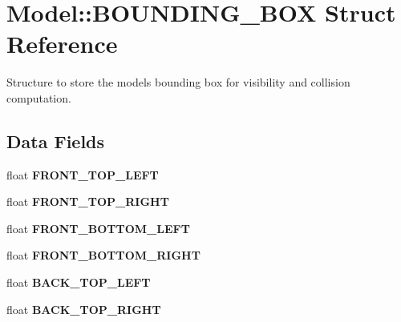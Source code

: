 \hypertarget{struct_model_1_1_b_o_u_n_d_i_n_g___b_o_x}{}\section{Model\+:\+:B\+O\+U\+N\+D\+I\+N\+G\+\_\+\+B\+OX Struct Reference}
\label{struct_model_1_1_b_o_u_n_d_i_n_g___b_o_x}


Structure to store the models bounding box for visibility and collision computation.  


\subsection*{Data Fields}
\begin{DoxyCompactItemize}
\item 
float {\bfseries F\+R\+O\+N\+T\+\_\+\+T\+O\+P\+\_\+\+L\+E\+FT}\hypertarget{struct_model_1_1_b_o_u_n_d_i_n_g___b_o_x_a65787e6454e3e94e8144a039fe5eb1fc}{}\label{struct_model_1_1_b_o_u_n_d_i_n_g___b_o_x_a65787e6454e3e94e8144a039fe5eb1fc}

\item 
float {\bfseries F\+R\+O\+N\+T\+\_\+\+T\+O\+P\+\_\+\+R\+I\+G\+HT}\hypertarget{struct_model_1_1_b_o_u_n_d_i_n_g___b_o_x_a9ed20b67bb450f2e9dcb2f81265faaba}{}\label{struct_model_1_1_b_o_u_n_d_i_n_g___b_o_x_a9ed20b67bb450f2e9dcb2f81265faaba}

\item 
float {\bfseries F\+R\+O\+N\+T\+\_\+\+B\+O\+T\+T\+O\+M\+\_\+\+L\+E\+FT}\hypertarget{struct_model_1_1_b_o_u_n_d_i_n_g___b_o_x_afd1d232efb0ca43160624cf3ae2b0ae6}{}\label{struct_model_1_1_b_o_u_n_d_i_n_g___b_o_x_afd1d232efb0ca43160624cf3ae2b0ae6}

\item 
float {\bfseries F\+R\+O\+N\+T\+\_\+\+B\+O\+T\+T\+O\+M\+\_\+\+R\+I\+G\+HT}\hypertarget{struct_model_1_1_b_o_u_n_d_i_n_g___b_o_x_a8cbb072a587d3453f961c0bb3cae0e59}{}\label{struct_model_1_1_b_o_u_n_d_i_n_g___b_o_x_a8cbb072a587d3453f961c0bb3cae0e59}

\item 
float {\bfseries B\+A\+C\+K\+\_\+\+T\+O\+P\+\_\+\+L\+E\+FT}\hypertarget{struct_model_1_1_b_o_u_n_d_i_n_g___b_o_x_aeb402ac7832ab6f1af573d85e64fe8a2}{}\label{struct_model_1_1_b_o_u_n_d_i_n_g___b_o_x_aeb402ac7832ab6f1af573d85e64fe8a2}

\item 
float {\bfseries B\+A\+C\+K\+\_\+\+T\+O\+P\+\_\+\+R\+I\+G\+HT}\hypertarget{struct_model_1_1_b_o_u_n_d_i_n_g___b_o_x_a43ea2d971ded0474794af07faa97bf68}{}\label{struct_model_1_1_b_o_u_n_d_i_n_g___b_o_x_a43ea2d971ded0474794af07faa97bf68}


\end{DoxyCompactItemize}
